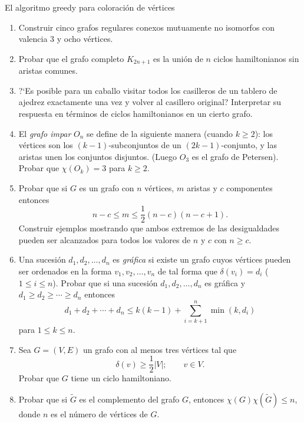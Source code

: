 \begin{section}{El algoritmo greedy para coloración de vértices}
\begin{enumerate}
\item Construir cinco grafos regulares conexos mutuamente no isomorfos
con valencia $3$ y ocho vértices.

\item Probar que el grafo completo $K_{2n+1}$ es la unión de $n$ ciclos
hamiltonianos sin aristas comunes.

\item ?`Es posible para un caballo visitar todos los casilleros de un
tablero de ajedrez exactamente una vez y volver al casillero
original? Interpretar su respuesta en términos de ciclos
hamiltonianos en un cierto grafo.

\item El {\em grafo impar} $O_n$ se define de la siguiente
manera   (cuando $k\ge 2$): los vértices son
los $(k-1)$-subconjuntos de un $(2k-1)$-conjunto, y las aristas
unen los conjuntos disjuntos. (Luego $O_3$ es el grafo de
Petersen). Probar que $\chi(O_k)=3$ para $k\ge 2$.

\item Probar que si $G$ es un grafo con $n$ vértices, $m$ aristas y $c$
componentes entonces
$$
n-c \le m \le \frac12(n-c)(n-c+1).
$$
Construir ejemplos mostrando que ambos extremos de las
desigualdades pueden ser alcanzados para todos los valores de $n$
y $c$ con $n\ge c$.

\item Una sucesión $d_1,d_2,\ldots,d_n$ es {\em gráfica} si existe un
grafo cuyos vértices pueden ser ordenados en la forma
$v_1,v_2,\ldots,v_n$ de tal forma que $\delta(v_i)=d_i$ ($1\le i
\le n$). Probar que si una sucesión $d_1,d_2,\ldots,d_n$ es
gráfica y $d_1 \ge d_2 \ge \cdots \ge d_n$ entonces
$$
d_1 + d_2 + \cdots + d_n \le k(k-1) + \sum_{i=k+1}^n
\operatorname{min}(k,d_i)
$$
para $1 \le k \le n$.

\item Sea $G=(V,E)$ un grafo con al menos tres vértices tal que
$$
\delta(v) \ge \frac12 |V|;\qquad v\in V.
$$
Probar que $G$ tiene un ciclo hamiltoniano.

\item Probar que si $\tilde G$ es el complemento del grafo $G$, entonces
$\chi(G)\chi(\tilde G)\le n$, donde $n$ es el número de vértices
de $G$.
\end{enumerate}
\end{section}

